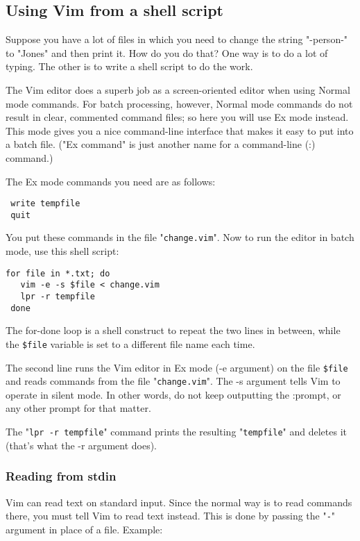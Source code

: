 \subsection{Using Vim from a shell script}
Suppose you have a lot of files in which you need to change the string "-person-" to "Jones" and then print it.
How do you do that?  One way is to do a lot of typing.
The other is to write a shell script to do the work.

The Vim editor does a superb job as a screen-oriented editor when using Normal mode commands.
For batch processing, however, Normal mode commands do not result in clear, commented command files; so here you will use Ex mode instead.
This mode gives you a nice command-line interface that makes it easy to put into a batch file.
("Ex command" is just another name for a command-line (:) command.)

The Ex mode commands you need are as follows:

\begin{Verbatim}[samepage=true]
 %s/-person-/Jones/g
 write tempfile
 quit
\end{Verbatim}

You put these commands in the file "\texttt{change.vim}".
Now to run the editor in batch mode, use this shell script:

\begin{Verbatim}[samepage=true]
 for file in *.txt; do
   vim -e -s $file < change.vim
   lpr -r tempfile
 done
\end{Verbatim}

The for-done loop is a shell construct to repeat the two lines in between, while the \texttt{\$file} variable is set to a different file name each time.

The second line runs the Vim editor in Ex mode (-e argument) on the file \texttt{\$file} and reads commands from the file "\texttt{change.vim}".
The -s argument tells Vim to operate in silent mode.
In other words, do not keep outputting the :prompt, or any other prompt for that matter.

The "\texttt{lpr -r tempfile}" command prints the resulting "\texttt{tempfile}" and deletes it (that's what the -r argument does).
\subsubsection{Reading from stdin}
Vim can read text on standard input.
Since the normal way is to read commands there, you must tell Vim to read text instead.
This is done by passing the "\texttt{-}" argument in place of a file.
Example:

